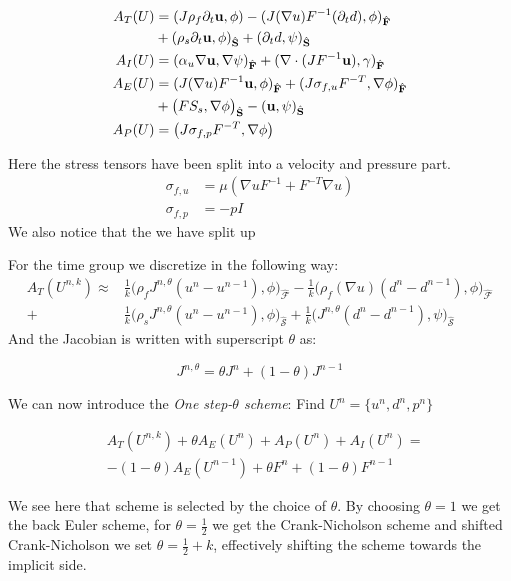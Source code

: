 \begin{align}
A_T(U) &= (J \rho_f \partial_t \bold{u} , \phi ) - (J (\nabla u)F^{-1}(\partial_t d) , \phi )_{\mathcal{\hat{F}}} \\
	    & + (\rho_s \partial_t \bold{u} , \phi)_{\mathcal{\hat{S}}} + (\partial_t d , \psi)_{\mathcal{\hat{S}}}  \\
A_I(U) &= ( \alpha_u \nabla \bold{u}, \nabla \psi)_{\mathcal{\hat{F}}} + (\nabla \cdot (J F^{-1} \bold{u}), \gamma)_{\mathcal{\hat{F}}} \\
A_E(U) &= (J (\nabla u)F^{-1} \bold{u} , \phi )_{\mathcal{\hat{F}}} + ( J \sigma_{f,u} F^{-T} , \nabla \phi )_{\mathcal{\hat{F}}} \\
	    & + \big(F S_s, \nabla \phi \big)_{\mathcal{\hat{S}}} - ( \bold{u} , \psi )_{\mathcal{\hat{S}}} \\
A_P(U) &= \big( J \sigma_{f,p} F^{-T}, \nabla \phi  \big)  	 		
\end{align}

Here the stress tensors have been split into a velocity and pressure part. 
\begin{align}
\sigma_{f,u} &= \mu ( \nabla u F^{-1} + F^{-T} \nabla u) \\
\sigma_{f,p} &= -p I
\end{align}
We also notice that the we have split up 

For the time group we discretize in the following way:
\begin{align}
A_T(U^{n,k}) \approx & \frac{1}{k} \big( \rho_f J^{n,\theta} (u^n - u^{n-1}) , \phi  \big)_{\mathcal{\hat{F}}} - \frac{1}{k} \big( \rho_f (\nabla u ) (d^n - d^{n-1}) , \phi \big)_{\mathcal{\hat{F}}} \\
+ & \frac{1}{k} \big( \rho_s J^{n,\theta} (u^n - u^{n-1}) , \phi  \big)_{\mathcal{\hat{S}}} +  \frac{1}{k} \big(  J^{n,\theta} (d^n - d^{n-1}) , \psi  \big)_{\mathcal{\hat{S}}}
\end{align}
And the Jacobian is written with superscript $\theta$ as:

\begin{equation}
J^{n, \theta} = \theta J^n + (1-\theta)J^{n-1}
\end{equation}

We can now introduce the \textit{One step-$\theta$ scheme}: 
Find $U^n = \{u^n , d^n, p^n \}$

\begin{align}
& A_T(U^{n,k}) + \theta A_E(U^{n}) + A_P(U^{n}) + A_I(U^{n}) = \\
& - (1-\theta) A_E(U^{n-1}) + \theta F^n + (1-\theta) F^{n-1}  
\end{align}

We see here that scheme is selected by the choice of $\theta $. By choosing $ \theta = 1$ we get the back Euler scheme, for $ \theta = \frac{1}{2}$ we get the Crank-Nicholson scheme and shifted Crank-Nicholson we set $ \theta = \frac{1}{2} + k$, effectively shifting the scheme towards the implicit side. 






